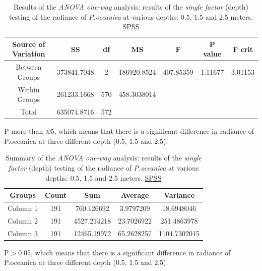 \documentclass[10pt, a4paper]{article}
\begin{document}
\begin{appendices}
\begin{table}[htbp]
	\caption{Results of the \textit{ANOVA one-way} analysis: results of the \textit{single factor} (depth) testing of the radiance of \textit{P.oceanica} at various depths: 0.5, 1.5 and 2.5 meters. \href{http://www.spss.com/}{SPSS}}\label{tab:8}
	\begin{center}
	\begin{tabular}{|c|c|c|c|c|c|c|}
		\hline\hline
		\textbf{Source of Variation} & \textbf{SS} & \textbf{df} & \textbf{MS} & \textbf{F} & \textbf{P value} & \textbf{F crit} \\ \hline
		Between Groups & 373841.7048 & 2 & 186920.8524 & 407.85359 & 1.11677 & 3.01153 \\ \hline
		Within Groups & 261233.1668 & 570 & 458.3038014 & & & \\ \hline
		Total &  635074.8716 & 572 & & & & \\ \hline
	\end{tabular}
	\end{center} 
	P more than .05, which means that there is a significant difference in radiance of P.oceanica at three different depth (0.5, 1.5 and 2.5). 
	
\end{table}

\begin{table}[htbp]
	\caption{Summary of the \textit{ANOVA one-way} analysis: results of the \textit{single factor} (depth) testing of the radiance of \textit{P.oceanica} at various depths: 0.5, 1.5 and 2.5 meters. \href{http://www.spss.com/}{SPSS}}\label{tab:A.7}
	\begin{center}
	\begin{tabular}{|c|c|c|c|c|}
		\hline\hline
		\textbf{Groups} & \textbf{Count} & \textbf{Sum} & \textbf{Average} & \textbf{Variance} \\ \hline\hline
		Column 1 & 191 &	760.126692 & 3.9797209 & 18.6948046 \\ \hline
		Column 2 & 191 &	4527.214218 & 23.7026922  & 251.4863978 \\ \hline
		Column 3 & 191 &	12465.19972 & 65.2628257 & 1104.7302015 \\ \hline
	\end{tabular}
	\end{center}
	P$>$0.05, which means that there is a significant difference in radiance of P.oceanica at three different depth (0.5, 1.5 and 2.5). 
 	
\end{table}
\pagebreak


\end{appendices}
\end{document}
